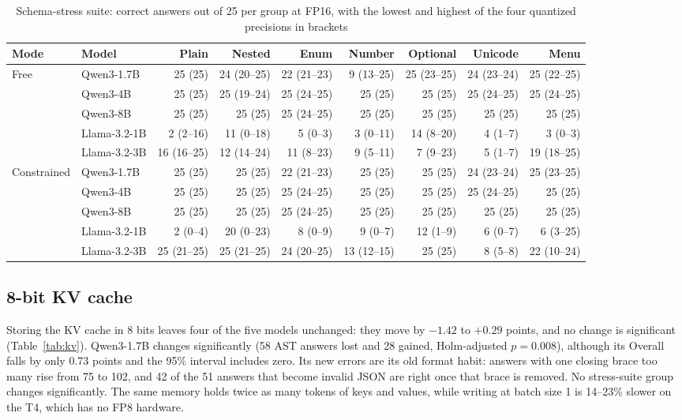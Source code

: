 \documentclass[conference]{IEEEtran}
\begin{document}
\begin{table}[t]
\centering
\caption{Schema-stress suite: correct answers out of 25 per group at FP16, with the lowest and highest of the four
quantized precisions in brackets}\label{tab:stress}
\begin{tabular}{llrrrrrrr}
\toprule
Mode & Model & Plain & Nested & Enum & Number & Optional & Unicode & Menu \\
\midrule
Free & Qwen3-1.7B & 25 (25) & 24 (20--25) & 22 (21--23) & 9 (13--25) & 25 (23--25) & 24 (23--24) & 25 (22--25) \\
 & Qwen3-4B & 25 (25) & 25 (19--24) & 25 (24--25) & 25 (25) & 25 (25) & 25 (24--25) & 25 (24--25) \\
 & Qwen3-8B & 25 (25) & 25 (25) & 25 (24--25) & 25 (25) & 25 (25) & 25 (25) & 25 (25) \\
 & Llama-3.2-1B & 2 (2--16) & 11 (0--18) & 5 (0--3) & 3 (0--11) & 14 (8--20) & 4 (1--7) & 3 (0--3) \\
 & Llama-3.2-3B & 16 (16--25) & 12 (14--24) & 11 (8--23) & 9 (5--11) & 7 (9--23) & 5 (1--7) & 19 (18--25) \\
\midrule
Constrained & Qwen3-1.7B & 25 (25) & 25 (25) & 22 (21--23) & 25 (25) & 25 (25) & 24 (23--24) & 25 (23--25) \\
 & Qwen3-4B & 25 (25) & 25 (25) & 25 (24--25) & 25 (25) & 25 (25) & 25 (24--25) & 25 (25) \\
 & Qwen3-8B & 25 (25) & 25 (25) & 25 (24--25) & 25 (25) & 25 (25) & 25 (25) & 25 (25) \\
 & Llama-3.2-1B & 2 (0--4) & 20 (0--23) & 8 (0--9) & 9 (0--7) & 12 (1--9) & 6 (0--7) & 6 (3--25) \\
 & Llama-3.2-3B & 25 (21--25) & 25 (21--25) & 24 (20--25) & 13 (12--15) & 25 (25) & 8 (5--8) & 22 (10--24) \\
\bottomrule
\end{tabular}
\end{table}

\subsection{8-bit KV cache}
Storing the KV cache in 8 bits leaves four of the five models unchanged: they move by $-1.42$ to $+0.29$ points,
and no change is significant (Table~\ref{tab:kv}). Qwen3-1.7B changes significantly (58 AST answers lost and 28
gained, Holm-adjusted $p = 0.008$), although its Overall falls by only 0.73 points and the 95\% interval includes
zero. Its new errors are its old format habit: answers with one closing brace too many rise from 75 to 102, and 42
of the 51 answers that become invalid JSON are right once that brace is removed. No stress-suite group changes
significantly. The same memory holds twice as many tokens of keys and values, while writing at batch size 1 is
14--23\% slower on the T4, which has no FP8 hardware.
\end{document}
